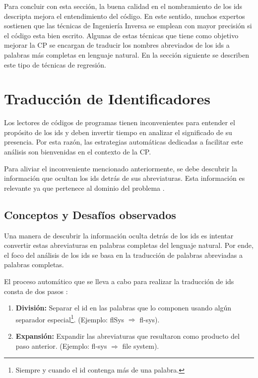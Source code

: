 \documentclass[a4paper,12pt]{report}
\begin{document}
Para concluir con esta sección, la buena calidad en el nombramiento de los ids descripta mejora el entendimiento del código. En este sentido, muchos expertos sostienen que las técnicas de Ingeniería Inversa se emplean con mayor precisión si el código esta bien escrito. Algunas de estas técnicas que tiene como objetivo mejorar la CP se encargan de traducir los nombres abreviados de los ids a palabras más completas en lenguaje natural. En la sección siguiente se describen este tipo de técnicas de regresión.

\pagebreak
\section{Traducción de Identificadores}
\label{sec:tradIdDicc}%

Los lectores de códigos de programas tienen inconvenientes para entender el propósito de los ids y deben invertir tiempo en analizar el significado de su presencia. Por esta razón, las estrategias automáticas dedicadas a facilitar este análisis son bienvenidas en el contexto de la CP.

Para aliviar el inconveniente mencionado anteriormente, se debe descubrir la información que ocultan los ids detrás de sus abreviaturas. Esta información es relevante ya que pertenece al dominio del problema \cite{EHPV09,LFBEX07}. 

\subsection{Conceptos y Desafíos observados}

Una manera de descubrir la información oculta detrás de los ids es intentar convertir estas abreviaturas en palabras completas del lenguaje natural. Por ende, el foco del análisis de los ids se basa en la traducción de palabras abreviadas a palabras completas.

El proceso automático que se lleva a cabo para realizar la traducción de ids consta de dos pasos \cite{LFBEX07}:

\begin{enumerate}
\itemsep0em%
\item \textbf{División:} Separar el id en las palabras que lo componen usando algún separador especial\footnote[1]{Siempre y cuando el id contenga más de una palabra.}. (Ejemplo: \textsf{flSys} $\Rightarrow$ \textsf{fl-sys}).

\item \textbf{Expansión:} Expandir las abreviaturas que resultaron como producto del paso anterior. (Ejemplo: \textsf{fl-sys} $\Rightarrow$ \textsf{file system}).
\end{enumerate}
\end{document}
